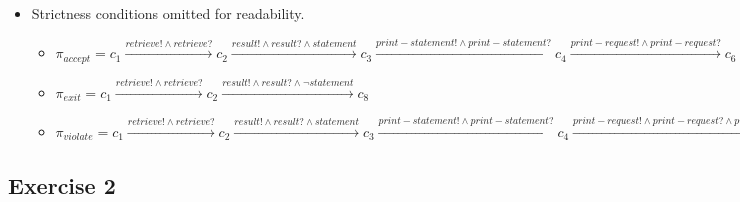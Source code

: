 \documentclass{scrartcl}
\begin{document}
\begin{itemize}
    \item[(iii)] Strictness conditions omitted for readability.\\
        \begin{itemize}


         \item[a)] $ \pi_{accept} = c_1 \xrightarrow{retrieve! \land retrieve?} c_2 \xrightarrow{result! \land result? \land statement} c_3 \xrightarrow{print-statement! \land print-statement?} c_4 \xrightarrow{print-request! \land print-request?} c_6 \xrightarrow{confirm! \land confirm?} c_7 \xrightarrow{main-menu! \land main-menu?} c_8$

         \item[b)] $ \pi_{exit} = c_1 \xrightarrow{retrieve! \land retrieve?} c_2 \xrightarrow{result! \land result? \land \neg statement} c_8 $

         \item[c)] $ \pi_{violate} = c_1 \xrightarrow{retrieve! \land retrieve?} c_2 \xrightarrow{result! \land result? \land statement} c_3 \xrightarrow{print-statement! \land print-statement?} c_4 \xrightarrow{print-request! \land print-request? \land print} illegal$
        \end{itemize}
\end{itemize}



\subsection*{Exercise 2}
\end{document}
